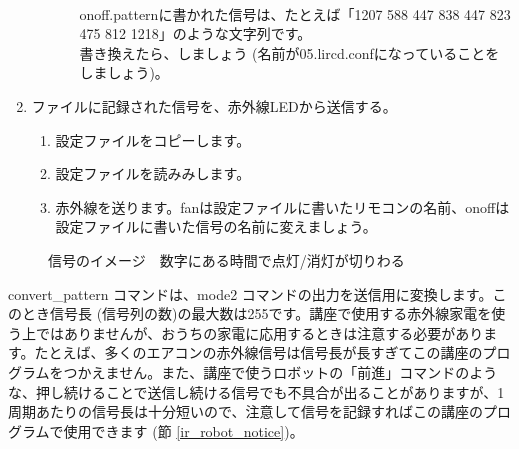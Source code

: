 \begin{enumerate}
\begin{enumerate}[1]
\begin{enumerate}[(1)]
\\onoff.patternに書かれた信号は、たとえば「1207 588 447 838 447 823 475 812 1218」のような文字列です。\\書き換えたら、しましょう (名前が05.lircd.confになっていることをしましょう)。
  \end{enumerate}
 \end{enumerate}
\item ファイルに記録された信号を、赤外線LEDから送信する。
 \begin{enumerate}[1]
  \item 設定ファイルをコピーします。 \\ 
  \item 設定ファイルを読みみします。\\ 
  \item 赤外線を送ります。fanは設定ファイルに書いたリモコンの名前、onoffは設定ファイルに書いた信号の名前に変えましょう。\\  
 \end{enumerate}
\end{enumerate}

\begin{figure}[H]
    \centering
 
    \caption{信号のイメージ　数字にある時間で点灯/消灯が切りわる}
\end{figure}

convert\_pattern コマンドは、mode2 コマンドの出力を送信用に変換します。このとき信号長 (信号列の数)の最大数は255です。講座で使用する赤外線家電を使う上ではありませんが、おうちの家電に応用するときは注意する必要があります。たとえば、多くのエアコンの赤外線信号は信号長が長すぎてこの講座のプログラムをつかえません。また、講座で使うロボットの「前進」コマンドのような、押し続けることで送信し続ける信号でも不具合が出ることがありますが、1周期あたりの信号長は十分短いので、注意して信号を記録すればこの講座のプログラムで使用できます (節 \ref{ir_robot_notice})。\\

\begin{tcolorbox}[title=\useOmetoi]
    \begin{enumerate}
    \end{enumerate}
    \end{tcolorbox}
